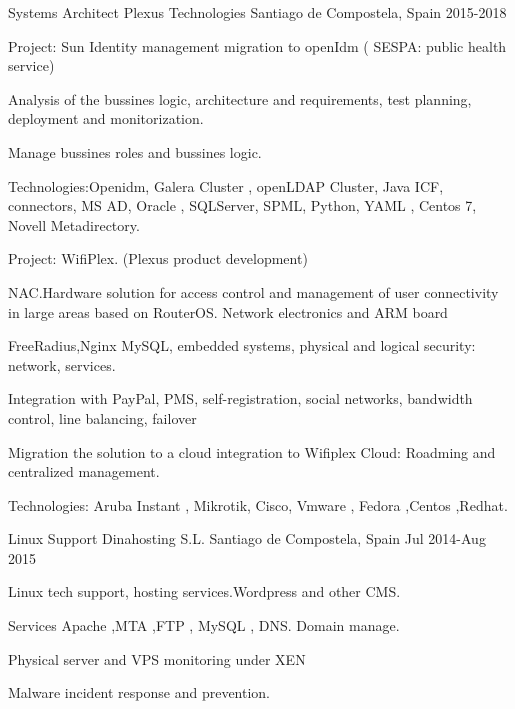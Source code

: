 \begin{cventries}
  \cventry
    {Systems Architect} %
    {Plexus Technologies} %
    {Santiago de Compostela, Spain} %
    {2015-2018} %
    {
      \begin{cvitems} %
        \item {Project: Sun Identity management migration to openIdm ( SESPA: public health service)}
        \item {Analysis of the bussines logic, architecture and requirements, test planning, deployment and monitorization.}
        \item {Manage bussines roles and bussines logic.}
        \item {Technologies:Openidm, Galera Cluster , openLDAP Cluster, Java ICF, connectors, MS AD, Oracle , SQLServer, SPML, Python, YAML , Centos 7, Novell Metadirectory.}
        \item {Project: WifiPlex. (Plexus product development)}
        \item {NAC.Hardware solution for access control and management of user connectivity in large areas based on RouterOS. Network electronics and ARM board}
        \item {FreeRadius,Nginx MySQL, embedded systems, physical and logical security: network, services.}
        \item {Integration with PayPal, PMS, self-registration, social networks, bandwidth control, line balancing, failover}
        \item {Migration the solution to a cloud integration to Wifiplex Cloud: Roadming and centralized management.}
        \item {Technologies: Aruba Instant , Mikrotik, Cisco, Vmware , Fedora ,Centos ,Redhat.} 
    \end{cvitems}
    }


  \cventry
    {Linux Support} %
    {Dinahosting S.L.} %
    {Santiago de Compostela, Spain} %
    {Jul 2014-Aug 2015 } %
    {
      \begin{cvitems} %
        \item {Linux tech support, hosting services.Wordpress and other CMS.}
        \item {Services Apache ,MTA ,FTP , MySQL , DNS. Domain manage.}
        \item {Physical server and VPS monitoring under XEN}
        \item {Malware incident response and prevention.}
    \end{cvitems}
    }


\end{cventries}

